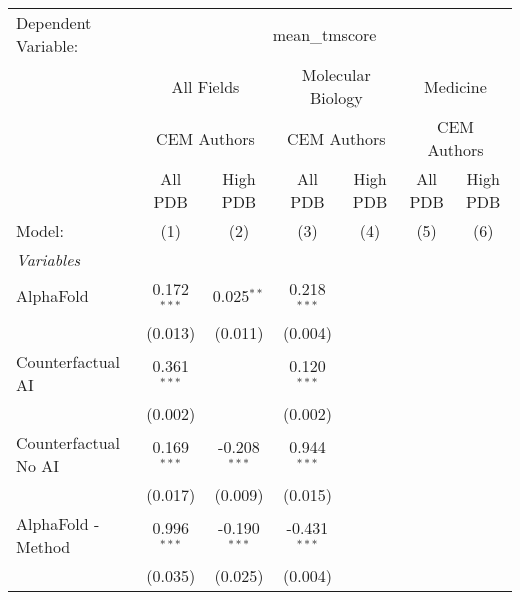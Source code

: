 \begingroup
\centering
\begin{tabular}{lcccccc}
   \tabularnewline \midrule \midrule
   Dependent Variable: & \multicolumn{6}{c}{mean\_tmscore}\\
 & \multicolumn{2}{c}{All Fields} & \multicolumn{2}{c}{Molecular Biology} & \multicolumn{2}{c}{Medicine} \\
\cmidrule(lr){2-3} \cmidrule(lr){4-5} \cmidrule(lr){6-7}
 & \multicolumn{2}{c}{CEM Authors} & \multicolumn{2}{c}{CEM Authors} & \multicolumn{2}{c}{CEM Authors} \\
\cmidrule(lr){2-3} \cmidrule(lr){4-5} \cmidrule(lr){6-7}
 & \multicolumn{1}{c}{All PDB} & \multicolumn{1}{c}{High PDB} & \multicolumn{1}{c}{All PDB} & \multicolumn{1}{c}{High PDB} & \multicolumn{1}{c}{All PDB} & \multicolumn{1}{c}{High PDB} \\
\cmidrule(lr){2-2} \cmidrule(lr){3-3} \cmidrule(lr){4-4} \cmidrule(lr){5-5} \cmidrule(lr){6-6} \cmidrule(lr){7-7}
   Model:                                                     & (1)            & (2)            & (3)            & (4) & (5) & (6)\\  
   \midrule
   \emph{Variables}\\
   AlphaFold                                                  & 0.172$^{***}$  & 0.025$^{**}$   & 0.218$^{***}$  &     &     &   \\   
                                                              & (0.013)        & (0.011)        & (0.004)        &     &     &   \\   
   Counterfactual AI                                          & 0.361$^{***}$  &                & 0.120$^{***}$  &     &     &   \\   
                                                              & (0.002)        &                & (0.002)        &     &     &   \\   
   Counterfactual No AI                                       & 0.169$^{***}$  & -0.208$^{***}$ & 0.944$^{***}$  &     &     &   \\   
                                                              & (0.017)        & (0.009)        & (0.015)        &     &     &   \\   
   AlphaFold - Method                                         & 0.996$^{***}$  & -0.190$^{***}$ & -0.431$^{***}$ &     &     &   \\   
                                                              & (0.035)        & (0.025)        & (0.004)        &     &     &   \\   

\end{tabular}
